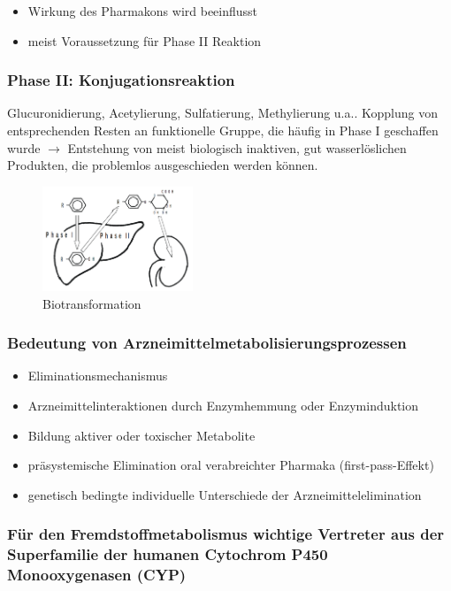 \documentclass[10pt,a4paper]{report}
\begin{document}
\begin{itemize}
\item Wirkung des Pharmakons wird beeinflusst
\item meist Voraussetzung für Phase II Reaktion
\end{itemize}
\subsubsection{Phase II: Konjugationsreaktion}
Glucuronidierung, Acetylierung, Sulfatierung, Methylierung u.a.. Kopplung von entsprechenden Resten an funktionelle Gruppe, die häufig in Phase I geschaffen wurde $\rightarrow$ Entstehung von meist biologisch inaktiven, gut wasserlöslichen Produkten, die problemlos ausgeschieden werden können.
\begin{figure}[h]
	\centering 
	\includegraphics[width=0.4\textwidth]{Biotransformation.png} 
	\caption{Biotransformation} 
	\label{fig:Biotransformation}
\end{figure}

\subsubsection{Bedeutung von Arzneimittelmetabolisierungsprozessen}
\begin{itemize}
	\item Eliminationsmechanismus
	\item Arzneimittelinteraktionen durch Enzymhemmung oder Enzyminduktion
	\item Bildung aktiver oder toxischer Metabolite
	\item präsystemische Elimination oral verabreichter Pharmaka (first-pass-Effekt)
	\item genetisch bedingte individuelle Unterschiede der Arzneimittelelimination
\end{itemize}

\subsubsection{Für den Fremdstoffmetabolismus wichtige Vertreter aus der Superfamilie der humanen Cytochrom P450 Monooxygenasen (CYP)} \mbox{}\\
\end{document}
